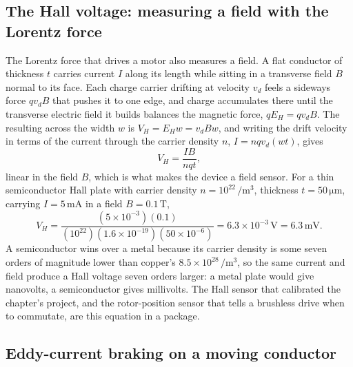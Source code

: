 \subsection{The Hall voltage: measuring a field with the Lorentz force}

The Lorentz force that drives a motor also measures a field. A flat
conductor of thickness $t$ carries current $I$ along its length while
sitting in a transverse field $B$ normal to its face. Each charge carrier
drifting at velocity $v_d$ feels a sideways force $q v_d B$ that pushes it
to one edge, and charge accumulates there until the transverse electric
field it builds balances the magnetic force, $q E_H = q v_d B$. The
resulting  across the width $w$ is $V_H = E_H w =
v_d B w$, and writing the drift velocity in terms of the current through
the carrier density $n$, $I = n q v_d (w t)$, gives
\[
V_H = \frac{I B}{n q t},
\]
linear in the field $B$, which is what makes the device a field sensor.
For a thin semiconductor Hall plate with carrier density $n = 10^{22}\,
\si{\per\meter\cubed}$, thickness $t = 50\,\si{\micro\meter}$, carrying
$I = 5\,\si{\milli\ampere}$ in a field $B = 0.1\,\si{\tesla}$,
\[
V_H = \frac{(5\times 10^{-3})(0.1)}{(10^{22})(1.6\times 10^{-19})
(50\times 10^{-6})} = 6.3\times 10^{-3}\,\si{\volt} = 6.3\,\si{\milli
\volt}.
\]
A semiconductor wins over a metal because its carrier density is some
seven orders of magnitude lower than copper's $8.5\times 10^{28}\,\si{
\per\meter\cubed}$, so the same current and field produce a Hall voltage
seven orders larger: a metal plate would give nanovolts, a semiconductor
gives millivolts. The Hall sensor that calibrated the chapter's project,
and the rotor-position sensor that tells a brushless drive when to
commutate, are this equation in a package.

\subsection{Eddy-current braking on a moving conductor}

